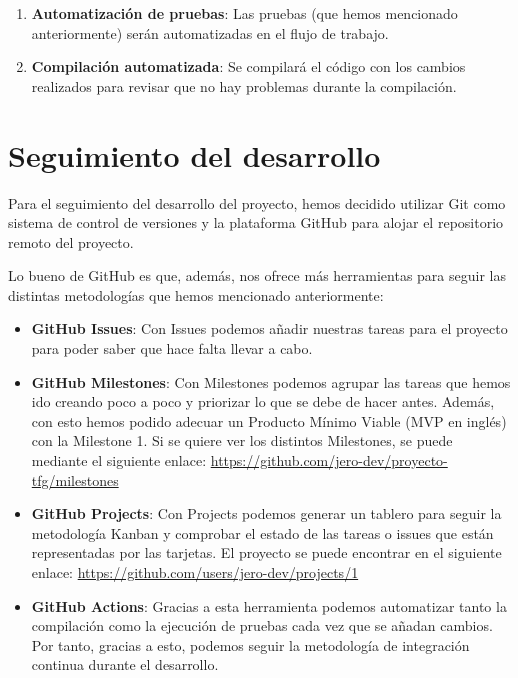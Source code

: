 \begin{enumerate}
    \item \textbf{Automatización de pruebas}: Las pruebas (que hemos mencionado 
    anteriormente) serán automatizadas en el flujo de trabajo.
    \item \textbf{Compilación automatizada}: Se compilará el código con los cambios 
    realizados para revisar que no hay problemas durante la compilación.
\end{enumerate}

\section{Seguimiento del desarrollo}

Para el seguimiento del desarrollo del proyecto, hemos decidido utilizar Git como 
sistema de control de versiones y la plataforma GitHub para alojar el repositorio 
remoto del proyecto.

Lo bueno de GitHub es que, además, nos ofrece más herramientas para seguir las 
distintas metodologías que hemos mencionado anteriormente:

\begin{itemize}
    \item \textbf{GitHub Issues}: Con Issues podemos añadir nuestras tareas para el 
    proyecto para poder saber que hace falta llevar a cabo.
    \item \textbf{GitHub Milestones}: Con Milestones podemos agrupar las tareas que 
    hemos ido creando poco a poco y priorizar lo que se debe de hacer antes. 
    Además, con esto hemos podido adecuar un Producto Mínimo Viable (MVP en inglés) 
    con la Milestone 1. Si se quiere ver los distintos Milestones, se puede 
    mediante el siguiente enlace: 
    \url{https://github.com/jero-dev/proyecto-tfg/milestones}
    \item \textbf{GitHub Projects}: Con Projects podemos generar un tablero para 
    seguir la metodología Kanban y comprobar el estado de las tareas o issues que 
    están representadas por las tarjetas. El proyecto se puede encontrar en el 
    siguiente enlace: \url{https://github.com/users/jero-dev/projects/1}
    \item \textbf{GitHub Actions}: Gracias a esta herramienta podemos automatizar 
    tanto la compilación como la ejecución de pruebas cada vez que se añadan 
    cambios. Por tanto, gracias a esto, podemos seguir la metodología de 
    integración continua durante el desarrollo.
\end{itemize}
